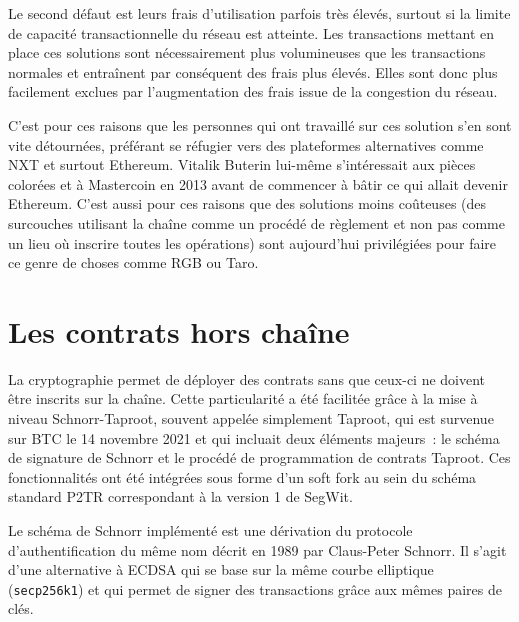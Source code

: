 Le second défaut est leurs frais d'utilisation parfois très élevés, surtout si la limite de capacité transactionnelle du réseau est atteinte. Les transactions mettant en place ces solutions sont nécessairement plus volumineuses que les transactions normales et entraînent par conséquent des frais plus élevés. Elles sont donc plus facilement exclues par l'augmentation des frais issue de la congestion du réseau.

C'est pour ces raisons que les personnes qui ont travaillé sur ces solution s'en sont vite détournées, préférant se réfugier vers des plateformes alternatives comme NXT et surtout Ethereum. Vitalik Buterin lui-même s'intéressait aux pièces colorées et à Mastercoin en 2013 avant de commencer à bâtir ce qui allait devenir Ethereum. C'est aussi pour ces raisons que des solutions moins coûteuses (des surcouches utilisant la chaîne comme un procédé de règlement et non pas comme un lieu où inscrire toutes les opérations) sont aujourd'hui privilégiées pour faire ce genre de choses comme RGB ou Taro.

\section*{Les contrats hors chaîne} %

La cryptographie permet de déployer des contrats sans que ceux-ci ne doivent être inscrits sur la chaîne. Cette particularité a été facilitée grâce à la mise à niveau Schnorr-Taproot, souvent appelée simplement Taproot, qui est survenue sur BTC le 14 novembre 2021 et qui incluait deux éléments majeurs~: le schéma de signature de Schnorr et le procédé de programmation de contrats Taproot. Ces fonctionnalités ont été intégrées sous forme d'un soft fork au sein du schéma standard P2TR correspondant à la version 1 de SegWit.

Le schéma de Schnorr implémenté est une dérivation du protocole d'authentification du même nom décrit en 1989 par Claus-Peter Schnorr. Il s'agit d'une alternative à ECDSA qui se base sur la même courbe elliptique (\texttt{secp256k1}) et qui permet de signer des transactions grâce aux mêmes paires de clés.

